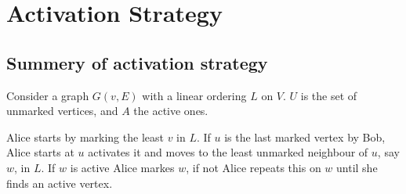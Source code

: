 %
%    
%    
%       
%       
%    
%    
%
%
%       
%    
%    

\section{Activation Strategy}
\subsection{Summery of activation strategy}

Consider a graph $G(v,E)$ with a linear ordering $L$ on $V$. $U$ is the set of unmarked vertices, and $A$ the active ones.

Alice starts by marking the least $v$ in $L$. If $u$ is the last marked vertex by Bob, Alice starts at $u$ activates it and moves to the least unmarked neighbour of $u$, say $w$, in $L$. If $w$ is active Alice markes $w$, if not Alice repeats this on $w$ until she finds an active vertex.

